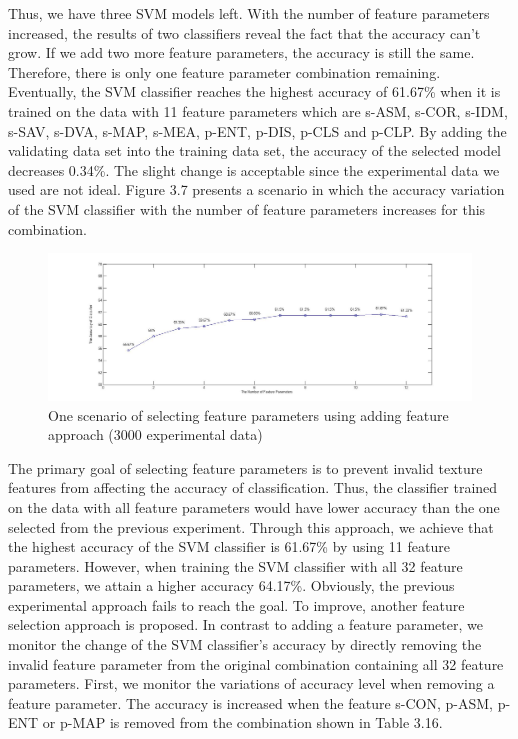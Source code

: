 Thus, we have three SVM models left. With the number of feature parameters increased, the results of two classifiers reveal the fact that the accuracy can't grow. If we add two more feature parameters, the accuracy is still the same. Therefore, there is only one feature parameter combination remaining. Eventually, the SVM classifier reaches the highest accuracy of 61.67\% when it is trained on the data with 11 feature parameters which are s-ASM, s-COR, s-IDM, s-SAV, s-DVA, s-MAP, s-MEA, p-ENT, p-DIS, p-CLS and p-CLP. By adding the validating data set into the training data set, the accuracy of the selected model decreases 0.34\%. The slight change is acceptable since the experimental data we used are not ideal. Figure 3.7 presents a scenario in which the accuracy variation of  the SVM classifier with the number of feature parameters increases for this combination.
\begin{figure}
\includegraphics[width=\linewidth]{fig3_7}
\caption{One scenario of selecting feature parameters using adding feature approach (3000 experimental data)}
\end{figure}
The primary goal of selecting feature parameters is to prevent invalid texture features from affecting the accuracy of classification. Thus, the classifier trained on the data with all feature parameters would have lower accuracy than the one selected from the previous experiment. Through this approach, we achieve that the highest accuracy of the SVM classifier is 61.67\% by using 11 feature parameters. However, when training the SVM classifier with all 32 feature parameters, we attain a higher accuracy 64.17\%. Obviously, the previous experimental approach fails to reach the goal. To improve, another feature selection approach is proposed. In contrast to adding a feature parameter, we monitor the change of the SVM classifier's accuracy by directly removing the invalid feature parameter from the original combination containing all 32 feature parameters. First, we monitor the variations of accuracy level when removing a feature parameter. The accuracy is increased when the feature s-CON, p-ASM, p-ENT or p-MAP is removed from the combination shown in Table 3.16. 
